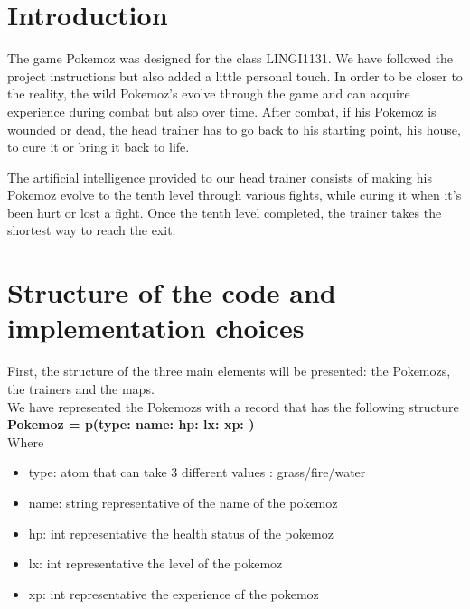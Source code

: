 \documentclass[a4paper,10pt]{article}
\begin{document}
\section*{Introduction}

The game Pokemoz was designed for the class LINGI1131. We have followed the project instructions but also added a little personal touch. 
In order to be closer to the reality, the wild Pokemoz’s evolve through the game and can acquire experience during combat but also over time.
After combat, if his Pokemoz is wounded or dead, the head trainer has to go back to his starting point, his house, to cure it or bring it back to life. 

The artificial intelligence provided to our head trainer consists of making his Pokemoz evolve to the tenth level through various fights, while curing it when it’s been hurt or lost a fight. 
Once the tenth level completed, the trainer takes the shortest way to reach the exit.

\section*{Structure of the code and implementation choices}

First, the structure of the three main elements will be presented: the Pokemozs, the trainers and the maps.\\

We have represented the Pokemozs with a record that has the following structure \\
\textbf{Pokemoz = p(type: name:  hp:  lx: xp: )} \\
Where
\begin{itemize}
\item type:  atom that can take 3 different values : grass/fire/water 
\item    name: string representative of the name of the pokemoz
\item    hp: int representative the health status of the pokemoz
\item    lx: int representative the level of the pokemoz
\item    xp: int representative the experience of the pokemoz \\ 

\end{itemize}    
\end{document}
